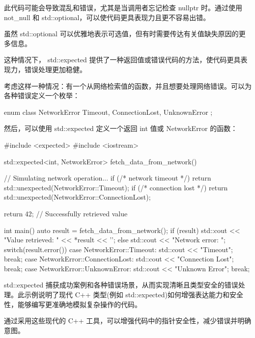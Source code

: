 此代码可能会导致混乱和错误，尤其是当调用者忘记检查 nullptr 时。通过使用 not\_null 和 std::optional，可以使代码更具表现力且更不容易出错。


虽然 std::optional 可以优雅地表示可选值，但有时需要传达有关值缺失原因的更多信息。

这种情况下， std::expected 提供了一种返回值或错误代码的方法，使代码更具表现力，错误处理更加稳健。

考虑这样一种情况：有一个从网络检索值的函数，并且想要处理网络错误。可以为各种错误定义一个枚举：

\begin{cpp}
enum class NetworkError {
    Timeout,
    ConnectionLost,
    UnknownError
};
\end{cpp}

然后，可以使用 std::expected 定义一个返回 int 值或 NetworkError 的函数：

\begin{cpp}
#include <expected>
#include <iostream>

std::expected<int, NetworkError> fetch_data_from_network() {
    // Simulating network operation...
    if (/* network timeout */) {
        return std::unexpected(NetworkError::Timeout);
    }
    if (/* connection lost */) {
        return std::unexpected(NetworkError::ConnectionLost);
    }

    return 42; // Successfully retrieved value
}

int main() {
    auto result = fetch_data_from_network();
    if (result) {
        std::cout << "Value retrieved: " << *result << '\n';
    } else {
        std::cout << "Network error: ";
        switch(result.error()) {
            case NetworkError::Timeout:
                std::cout << "Timeout\n";
                break;
            case NetworkError::ConnectionLost:
                std::cout << "Connection Lost\n";
                break;
            case NetworkError::UnknownError:
                std::cout << "Unknown Error\n";
                break;
        }
    }
}
\end{cpp}

std::expected 捕获成功案例和各种错误场景，从而实现清晰且类型安全的错误处理。此示例说明了现代 C++ 类型(例如 std::expected)如何增强表达能力和安全性，能够编写更准确地模拟复杂操作的代码。

通过采用这些现代的 C++ 工具，可以增强代码中的指针安全性，减少错误并明确意图。








































